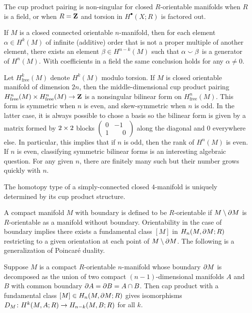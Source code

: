 \begin{proposition}
  The cup product pairing is non-singular for closed $R$-orientable manifolds when $R$ is a field, or when $R = \mathbf{Z}$ and torsion in $H^\bullet(X;R)$ is factored out.
\end{proposition}

\begin{corollary}
  If $M$ is a closed connected orientable $n$-manifold, then for each element $\alpha \in H^k(M)$ of infinite (additive) order that is not a proper multiple of another element, there exists an element $\beta \in H^{n-k}(M)$ such that $\alpha \smallsmile \beta$ is a generator of $H^n(M)$. With coefficients in a field the same conclusion holds for any $\alpha \neq 0$.
\end{corollary}

Let $H^k_{\textrm{free}}(M)$ denote $H^k(M)$ modulo torsion. If $M$ is closed orientable manifold of dimension $2n$, then the middle-dimensional cup product pairing $H^n_{\textnormal{free}}(M) \times H^n_{\textnormal{free}}(M) \rightarrow \mathbf{Z}$ is a nonsingular bilinear form on $H^n_{\textrm{free}}(M)$. This form is symmetric when $n$ is even, and skew-symmetric when $n$ is odd. In the latter case, it is always possible to chose a basis so the bilinear form is given by a matrix formed by $2 \times 2$ blocks $\left(\begin{smallmatrix} 0 & -1 \\ 1 & \phantom{-}0 \end{smallmatrix}\right)$ along the diagonal and $0$ everywhere else. In particular, this implies that if $n$ is odd, then the rank of $H^n(M)$ is even. If $n$ is even, classifying symmetric bilinear forms is an interesting algebraic question. For any given $n$, there are finitely many such but their number grows quickly with $n$.

\begin{theorem}[J.H.C. Whitehead]
  The homotopy type of a simply-connected closed $4$-manifold is uniquely determined by its cup product structure.
\end{theorem}

A compact manifold $M$ with boundary is defined to be $R$-orientable if $M \setminus \partial M$ is $R$-orientable as a manifold without boundary. Orientability in the case of boundary implies there exists a fundamental class $[M]$ in $H_n(M, \partial M; R)$ restricting to a given orientation at each point of $M \setminus \partial M$. The following is a generalization of Poincar\'e duality.

\begin{theorem}
  Suppose $M$ is a compact $R$-orientable $n$-manifold whose boundary $\partial M$ is decomposed as the union of two compact $(n-1)$-dimensional manifolds $A$ and $B$ with common boundary $\partial A = \partial B = A \cap B$. Then cap product with a fundamental class $[M] \in H_n(M, \partial M; R)$ gives isomorphisms $D_M \colon H^k(M,A;R) \rightarrow H_{n-k}(M,B;R)$ for all $k$.
\end{theorem}

